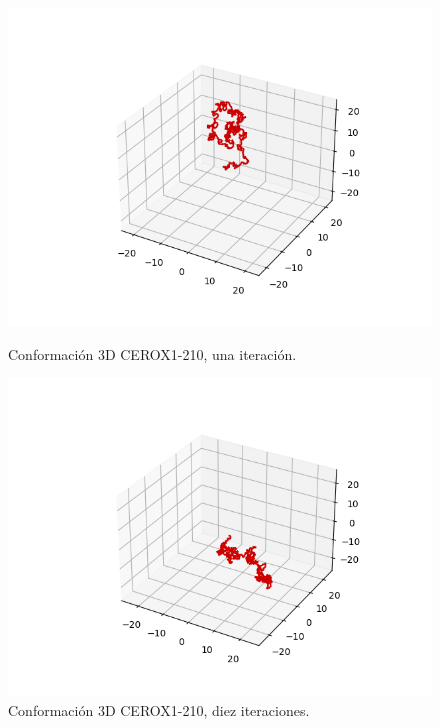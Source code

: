 \documentclass[a4paper,11pt,titlepage]{article}
\theoremstyle{definition}
\begin{document}
\begin{figure}[H]
    \centering
    \begin{minipage}[c]{0.31\textwidth}
        \centering
        \includegraphics[width=\textwidth]{images/CEROX1-210-db_one.png}
        \caption{Conformación 3D CEROX1-210, una iteración.}
        \label{fig:CEROX1-210-one}
    \end{minipage}
    \hfill
    \begin{minipage}[c]{0.31\textwidth}
        \centering
        \includegraphics[width=\textwidth]{images/CEROX1-210-db_iter.png}
        \caption{Conformación 3D CEROX1-210, diez iteraciones.}
        \label{fig:CEROX1-210-multi}
    \end{minipage}

\end{figure}
\end{document}
